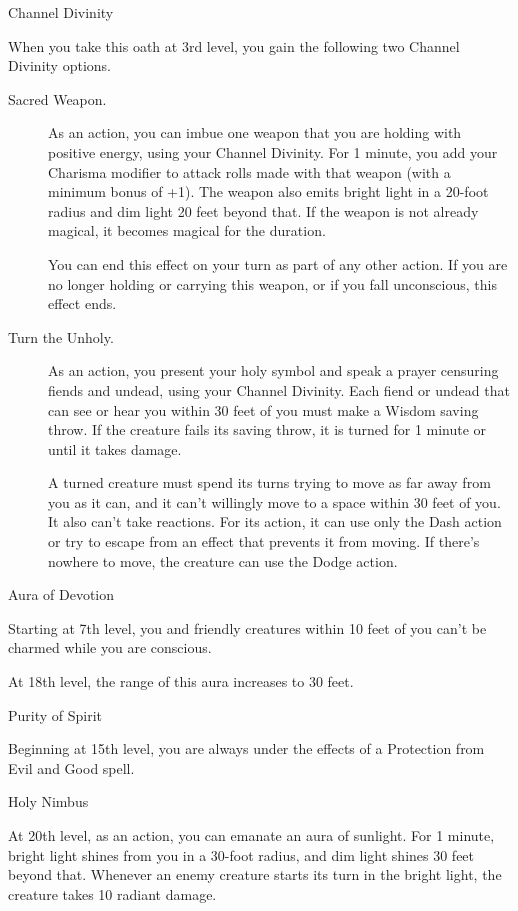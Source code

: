 Channel Divinity

When you take this oath at 3rd level, you gain the following two Channel
Divinity options.

\begin{description}
\item[Sacred Weapon.]
As an action, you can imbue one weapon that you are holding with
positive energy, using your Channel Divinity. For 1 minute, you add your
Charisma modifier to attack rolls made with that weapon (with a minimum
bonus of +1). The weapon also emits bright light in a 20-foot radius and
dim light 20 feet beyond that. If the weapon is not already magical, it
becomes magical for the duration.

You can end this effect on your turn as part of any other action. If you
are no longer holding or carrying this weapon, or if you fall
unconscious, this effect ends.
\item[Turn the Unholy.]
As an action, you present your holy symbol and speak a prayer censuring
fiends and undead, using your Channel Divinity. Each fiend or undead
that can see or hear you within 30 feet of you must make a Wisdom saving
throw. If the creature fails its saving throw, it is turned for 1 minute
or until it takes damage.

A turned creature must spend its turns trying to move as far away from
you as it can, and it can't willingly move to a space within 30 feet of
you. It also can't take reactions. For its action, it can use only the
Dash action or try to escape from an effect that prevents it from
moving. If there's nowhere to move, the creature can use the Dodge
action.
\end{description}

Aura of Devotion

Starting at 7th level, you and friendly creatures within 10 feet of you
can't be charmed while you are conscious.

At 18th level, the range of this aura increases to 30 feet.

Purity of Spirit

Beginning at 15th level, you are always under the effects of a
Protection from Evil and Good spell.

Holy Nimbus

At 20th level, as an action, you can emanate an aura of sunlight. For 1
minute, bright light shines from you in a 30-foot radius, and dim light
shines 30 feet beyond that. Whenever an enemy creature starts its turn
in the bright light, the creature takes 10 radiant damage.

